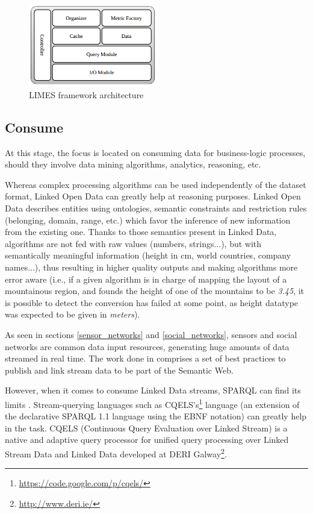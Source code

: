\begin{figure}
    \center
    \includegraphics[width=0.5\textwidth]{img/ld_approach/limes.png}
    \caption{LIMES framework architecture}
\end{figure}

\subsection{Consume}

At this stage, the focus is located on consuming data for business-logic processes, should they involve data mining algorithms, analytics, reasoning, etc.

Whereas complex processing algorithms can be used independently of the dataset format, Linked Open Data can greatly help at reasoning purposes. Linked Open Data describes entities using ontologies, semantic constraints and restriction rules (belonging, domain, range, etc.) which favor the inference of new information from the existing one. Thanks to those semantics present in Linked Data, algorithms are not fed with raw values (numbers, strings...), but with semantically meaningful information (height in cm, world countries, company names...), thus resulting in higher quality outputs and making algorithms more error aware (i.e., if a given algorithm is in charge of mapping the layout of a mountainous region, and founds the height of one of the mountains to be \textit{3.45}, it is possible to detect the conversion has failed at some point, as height datatype was expected to be given in \textit{meters}).

As seen in sections \ref{sensor_networks} and \ref{social_networks}, sensors and social networks are common data input resources, generating huge amounts of data streamed in real time. The work done in \cite{sequeda2009linked} comprises a set of best practices to publish and link stream data to be part of the Semantic Web.

However, when it comes to consume Linked Data streams, SPARQL can find its limits \cite{della2009s}. Stream-querying languages such as CQELS's\footnote{\url{https://code.google.com/p/cqels/}} language (an extension of the declarative SPARQL 1.1 language using the EBNF notation) can greatly help in the task. CQELS\cite{le2011native} (Continuous Query Evaluation over Linked Stream) is a native and adaptive query processor for unified query processing over Linked Stream Data and Linked Data developed at DERI Galway\footnote{\url{http://www.deri.ie/}}.

